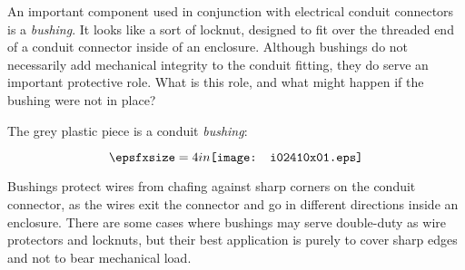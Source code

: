 

An important component used in conjunction with electrical conduit connectors is a {\it bushing}.  It looks like a sort of locknut, designed to fit over the threaded end of a conduit connector inside of an enclosure.  Although bushings do not necessarily add mechanical integrity to the conduit fitting, they do serve an important protective role.  What is this role, and what might happen if the bushing were not in place?







The grey plastic piece is a conduit {\it bushing}:

$$\epsfxsize=4in \texttt{[image: i02410x01.eps]}$$

Bushings protect wires from chafing against sharp corners on the conduit connector, as the wires exit the connector and go in different directions inside an enclosure.  There are some cases where bushings may serve double-duty as wire protectors and locknuts, but their best application is purely to cover sharp edges and not to bear mechanical load.












